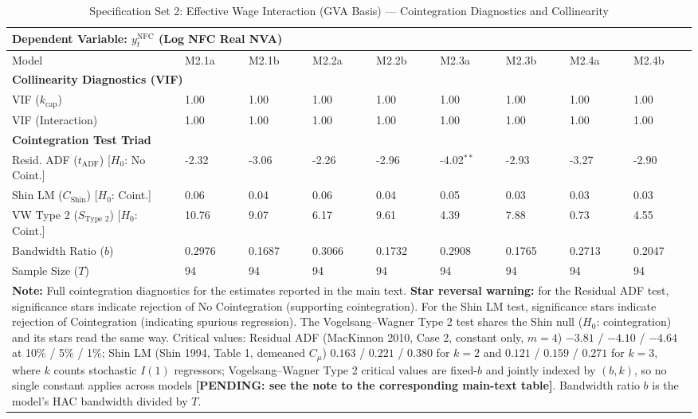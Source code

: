 \begin{table}[H]
\centering
\setlength{\tabcolsep}{2.5pt}
\caption{Specification Set 2: Effective Wage Interaction (GVA Basis) --- Cointegration Diagnostics and Collinearity}
\label{tab:specA_set2_gva_triad}
\scriptsize
\begin{tabular}{p{3.8cm}p{1.1cm}p{1.1cm}p{1.1cm}p{1.1cm}p{1.1cm}p{1.1cm}p{1.1cm}p{1.1cm}}
\toprule
\multicolumn{9}{l}{\textbf{Dependent Variable: $y_t^{\text{NFC}}$ (Log NFC Real NVA)}} \\
\midrule
Model & M2.1a & M2.1b & M2.2a & M2.2b & M2.3a & M2.3b & M2.4a & M2.4b \\
\midrule
\multicolumn{9}{l}{\textbf{Collinearity Diagnostics (VIF)}} \\
VIF ($k_{\text{cap}}$) & 1.00 & 1.00 & 1.00 & 1.00 & 1.00 & 1.00 & 1.00 & 1.00 \\
VIF (Interaction) & 1.00 & 1.00 & 1.00 & 1.00 & 1.00 & 1.00 & 1.00 & 1.00 \\
\midrule
\multicolumn{9}{l}{\textbf{Cointegration Test Triad}} \\
Resid. ADF ($t_{\text{ADF}}$) [$H_0$: No Coint.] & -2.32 & -3.06 & -2.26 & -2.96 & -4.02$^{**}$ & -2.93 & -3.27 & -2.90 \\
Shin LM ($C_{\text{Shin}}$) [$H_0$: Coint.] & 0.06 & 0.04 & 0.06 & 0.04 & 0.05 & 0.03 & 0.03 & 0.03 \\
VW Type 2 ($S_{\text{Type 2}}$) [$H_0$: Coint.] & 10.76 & 9.07 & 6.17 & 9.61 & 4.39 & 7.88 & 0.73 & 4.55 \\
\midrule
Bandwidth Ratio ($b$) & 0.2976 & 0.1687 & 0.3066 & 0.1732 & 0.2908 & 0.1765 & 0.2713 & 0.2047 \\
Sample Size ($T$) & 94 & 94 & 94 & 94 & 94 & 94 & 94 & 94 \\
\bottomrule
\multicolumn{9}{p{14.5cm}}{\footnotesize \textbf{Note:} Full cointegration diagnostics for the estimates reported in the main text. \textbf{Star reversal warning:} for the Residual ADF test, significance stars indicate rejection of No Cointegration (supporting cointegration). For the Shin LM test, significance stars indicate rejection of Cointegration (indicating spurious regression). The Vogelsang--Wagner Type 2 test shares the Shin null ($H_0$: cointegration) and its stars read the same way. Critical values: Residual ADF (MacKinnon 2010, Case 2, constant only, $m=4$) $-3.81$ / $-4.10$ / $-4.64$ at 10\% / 5\% / 1\%; Shin LM (Shin 1994, Table 1, demeaned $C_\mu$) $0.163$ / $0.221$ / $0.380$ for $k=2$ and $0.121$ / $0.159$ / $0.271$ for $k=3$, where $k$ counts stochastic $I(1)$ regressors; Vogelsang--Wagner Type 2 critical values are fixed-$b$ and jointly indexed by $(b, k)$, so no single constant applies across models \textbf{[PENDING: see the note to the corresponding main-text table]}. Bandwidth ratio $b$ is the model's HAC bandwidth divided by $T$.} \\
\end{tabular}
\end{table}
